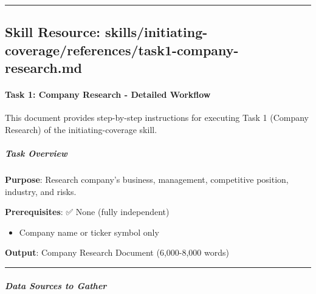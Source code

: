 \documentclass[11pt]{article}
\begin{document}
\vspace{0.8em}\hrule\vspace{0.8em}

\subsection{Skill Resource: skills/initiating-coverage/references/task1-company-research.md}\label{file:skills-initiating-coverage-references-task1-company-research-md}

\paragraph{Task 1: Company Research - Detailed Workflow}\mbox{}\par

This document provides step-by-step instructions for executing Task 1 (Company Research) of the initiating-coverage skill.


\subparagraph{Task Overview}\mbox{}\par

\textbf{Purpose}: Research company's business, management, competitive position, industry, and risks.


\textbf{Prerequisites}: ✅ None (fully independent)

\begin{itemize}[leftmargin=*,itemsep=2pt,topsep=2pt]
\item {} Company name or ticker symbol only
\end{itemize}

\textbf{Output}: Company Research Document (6,000-8,000 words)


\vspace{0.5em}\hrule\vspace{0.5em}

\subparagraph{Data Sources to Gather}\mbox{}\par
\end{document}
